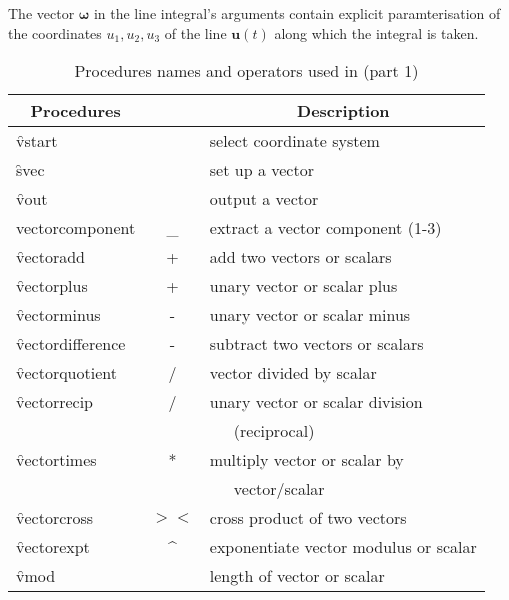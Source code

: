 The vector $\mathbf{\omega}$ in the line integral's arguments contain
explicit paramterisation of the coordinates $u_1, u_2, u_3$ of the
line $\mathbf{u}(t)$ along which the integral is taken.

\begin{table}
\begin{center}
\begin{tabular}{|l c l|} \hline 
\multicolumn{1}{|c}{Procedures} & & \multicolumn{1}{c|}{Description} \\ \hline
  \f{vstart} & & select coordinate system \\[\baselineskip]
  \f{svec} & & set up a vector \\
  \f{vout} & & output a vector \\
\f{ vectorcomponent} & \_ & extract a vector component (1-3) \\[\baselineskip]
\f{vectoradd} & + & add two vectors or scalars \\ 
\f{vectorplus} & + & unary vector or scalar plus\\ 
\f{vectorminus} & - & unary vector or scalar minus\\ 
\f{vectordifference} & - & subtract two vectors or scalars \\ 
\f{vectorquotient} & / & vector divided by scalar \\ 
\f{vectorrecip} & / & unary vector or scalar division \\ & & \ \ \ (reciprocal)\\ 
\f{vectortimes} & * & multiply vector or scalar by \\ & & \ \ \ vector/scalar \\ 
\f{vectorcross} & $><$ & cross product of two vectors \\ 
\f{vectorexpt} & \textasciicircum{} & exponentiate vector modulus or scalar \\
\f{vmod} & & length of vector or scalar \\ \hline
\end{tabular}
\end{center}
\caption{Procedures names and operators used in  (part 1)}
\end{table}


